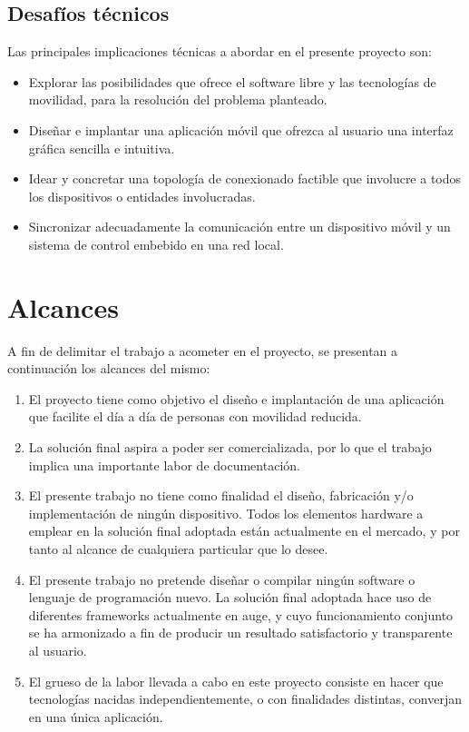 \subsection{Desafíos técnicos}
\label{subSec:desafiosTecnicos_deObjetivos&Alcances}
Las principales implicaciones técnicas a abordar en el presente proyecto son:
\begin{itemize}
	\item Explorar las posibilidades que ofrece el software libre y las tecnologías de movilidad, para la resolución del problema planteado.
	\item Diseñar e implantar una aplicación móvil que ofrezca al usuario una interfaz gráfica sencilla e intuitiva.
	\item Idear y concretar una topología de conexionado factible que involucre a todos los dispositivos o entidades involucradas.
	\item Sincronizar adecuadamente la comunicación entre un dispositivo móvil y un sistema de control embebido en una red local.		
\end{itemize}

\section{Alcances}
A fin de delimitar el trabajo a acometer en el proyecto, se presentan a continuación los alcances del mismo:
\begin{enumerate}
	\item El proyecto tiene como objetivo el diseño e implantación de una aplicación que facilite el día a día de personas con movilidad reducida.
	\item La solución final aspira a poder ser comercializada, por lo que el trabajo implica una importante labor de documentación. 
	\item El presente trabajo no tiene como finalidad el diseño, fabricación y/o implementación de ningún dispositivo. Todos los elementos hardware a emplear en la solución final adoptada están actualmente en el mercado, y por tanto al alcance de cualquiera particular que lo desee.
	\item El presente trabajo no pretende diseñar o compilar ningún software  o lenguaje de programación nuevo. La solución final adoptada hace uso de diferentes frameworks actualmente en auge, y cuyo funcionamiento conjunto se ha armonizado a fin de producir un resultado satisfactorio y transparente al usuario. 
	\item El grueso de la labor llevada a cabo en este proyecto consiste en hacer que tecnologías nacidas independientemente, o con finalidades distintas, converjan en una única aplicación.
\end{enumerate}

